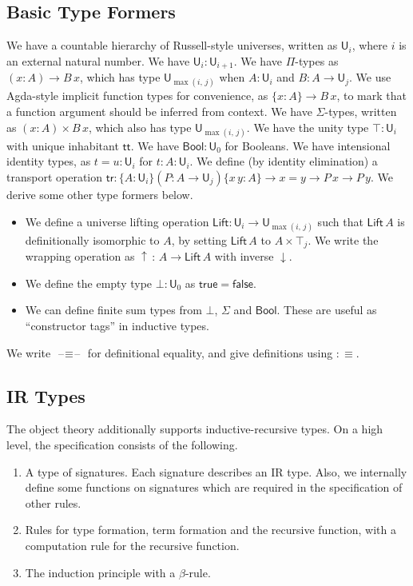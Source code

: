 \documentclass[acmsmall,screen,review,anonymous]{acmart}
\newcommand{\msf}[1]{{\mathsf{#1}}}
\newcommand{\U}{\msf{U}}
\newcommand{\Lift}{\msf{Lift}}
\newcommand{\lup}{\uparrow}
\newcommand{\ldown}{\downarrow}
\newcommand{\ttt}{\msf{tt}}
\newcommand{\blank}{{\mathord{\hspace{1pt}\text{--}\hspace{1pt}}}}
\newcommand{\tr}{\msf{tr}}
\newcommand{\Bool}{\msf{Bool}}
\newcommand{\true}{\msf{true}}
\newcommand{\false}{\msf{false}}
\begin{document}
\subsection{Basic Type Formers}
We have a countable hierarchy of Russell-style universes, written as $\U_i$, where $i$ is an
external natural number. We have $\U_i : \U_{i + 1}$. We have $\Pi$-types as $(x : A) \to B\,x$,
which has type $\U_{\max(i,\,j)}$ when $A : \U_i$ and $B : A \to \U_j$. We use Agda-style implicit
function types for convenience, as $\{x : A\} \to B\,x$, to mark that a function argument should be
inferred from context. We have $\Sigma$-types, written as $(x : A) \times B\,x$, which also has type
$\U_{\max(i,\,j)}$. We have the unity type $\top : \U_i$ with unique inhabitant $\ttt$. We have
$\Bool : \U_0$ for Booleans. We have intensional identity types, as $t = u : \U_i$ for $t : A :
\U_i$. We define (by identity elimination) a transport operation $\tr : \{A : \U_i\}(P : A \to
\U_j)\{x\,y : A\} \to x = y \to P\,x \to P\,y$. We derive some other type formers below.
\begin{itemize}
  \item We define a universe lifting operation $\Lift : \U_i \to \U_{\max(i,\,j)}$ such that
    $\Lift\,A$ is definitionally isomorphic to $A$, by setting $\Lift\,A$ to $A \times \top_j$. We
    write the wrapping operation as $\lup\,:\,A \to \Lift\,A$ with inverse $\ldown$.
  \item We define the empty type $\bot : \U_0$ as $\true = \false$.
  \item We can define finite sum types from $\bot$, $\Sigma$ and $\Bool$. These are useful
    as ``constructor tags'' in inductive types.
\end{itemize}
We write $\blank\!\!\equiv\!\!\blank$ for definitional equality, and give definitions using $:\equiv$.

\subsection{IR Types}
The object theory additionally supports inductive-recursive types. On a high level, the specification consists
of the following.
\begin{enumerate}
\item A type of signatures. Each signature describes an IR type. Also, we internally define some
  functions on signatures which are required in the specification of other rules.
\item Rules for type formation, term formation and the recursive function, with a computation rule
  for the recursive function.
\item The induction principle with a $\beta$-rule.
\end{enumerate}
\end{document}

